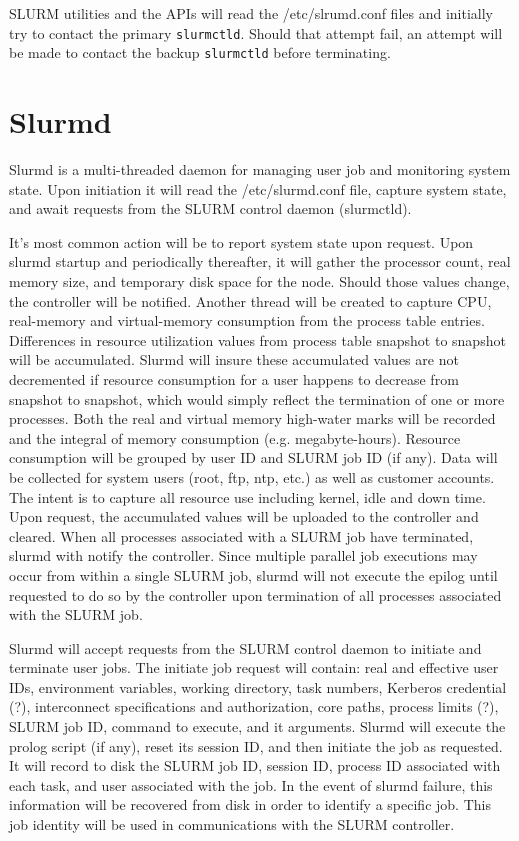 SLURM utilities and the APIs will read the /etc/slrumd.conf files 
and initially try to contact the primary {\tt slurmctld}. 
Should that attempt fail, an attempt will be made to contact the 
backup {\tt slurmctld} before terminating.

\section{Slurmd}

Slurmd is a multi-threaded daemon for managing user job and 
monitoring system state. 
Upon initiation it will read the /etc/slurmd.conf file, capture 
system state, and await requests from the SLURM control daemon 
(slurmctld). 

It's most common action will be to report system state upon 
request. Upon slurmd startup and periodically thereafter, it 
will gather the processor count, real memory size, and temporary 
disk space for the node. Should those values change, the 
controller will be notified. 
Another thread will be created to capture CPU, real-memory 
and virtual-memory consumption from the process table entries. 
Differences in resource utilization values from process table 
snapshot to snapshot will be accumulated. Slurmd will 
insure these accumulated values are not decremented if resource 
consumption for a user happens to decrease from snapshot to 
snapshot, which would simply reflect the termination of 
one or more processes.
Both the real and virtual memory high-water marks will be recorded and the 
integral of memory consumption (e.g. megabyte-hours).
Resource consumption will be grouped by user ID and 
SLURM job ID (if any). Data will be collected for 
system users (root, ftp, ntp, etc.) as well as 
customer accounts. The intent is to capture all resource 
use including kernel, idle and down time. 
Upon request, the accumulated values will be uploaded to 
the controller and cleared. 
When all processes associated with a SLURM job have terminated, 
slurmd with notify the controller. 
Since multiple parallel job executions may occur from within a 
single SLURM job, slurmd will not execute the epilog until 
requested to do so by the controller upon termination of all 
processes associated with the SLURM job.

Slurmd will accept requests from the SLURM control daemon 
to initiate and terminate user jobs. The initiate 
job request will contain: real and effective user IDs, 
environment variables, working directory, task numbers, 
Kerberos credential (?), interconnect specifications 
and authorization, core paths, process limits (?), SLURM job ID,
command to execute, and it arguments. Slurmd will 
execute the prolog script (if any), reset its session
ID, and then initiate the job as requested. It will 
record to disk the SLURM job ID, session ID, process ID associated 
with each task, and user associated with the job. 
In the event of slurmd failure, this information will 
be recovered from disk in order to identify a specific 
job. This  job identity will be used in communications 
with the SLURM controller.

